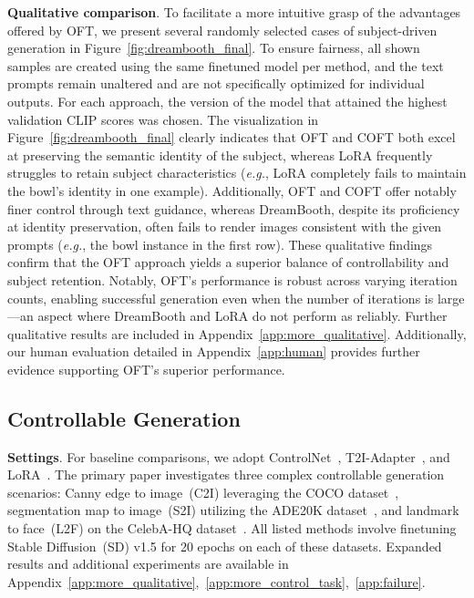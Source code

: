 {\textbf{Qualitative comparison}. To facilitate a more intuitive grasp of the advantages offered by OFT, we present several randomly selected cases of subject-driven generation in Figure~\ref{fig:dreambooth_final}. To ensure fairness, all shown samples are created using the same finetuned model per method, and the text prompts remain unaltered and are not specifically optimized for individual outputs. For each approach, the version of the model that attained the highest validation CLIP scores was chosen. The visualization in Figure~\ref{fig:dreambooth_final} clearly indicates that OFT and COFT both excel at preserving the semantic identity of the subject, whereas LoRA frequently struggles to retain subject characteristics (\emph{e.g.}, LoRA completely fails to maintain the bowl's identity in one example). Additionally, OFT and COFT offer notably finer control through text guidance, whereas DreamBooth, despite its proficiency at identity preservation, often fails to render images consistent with the given prompts (\emph{e.g.}, the bowl instance in the first row). These qualitative findings confirm that the OFT approach yields a superior balance of controllability and subject retention. Notably, OFT's performance is robust across varying iteration counts, enabling successful generation even when the number of iterations is large—an aspect where DreamBooth and LoRA do not perform as reliably. Further qualitative results are included in Appendix~\ref{app:more_qualitative}. Additionally, our human evaluation detailed in Appendix~\ref{app:human} provides further evidence supporting OFT's superior performance.

\subsection{Controllable Generation}

\textbf{Settings}. For baseline comparisons, we adopt ControlNet~\cite{zhang2023adding}, T2I-Adapter~\cite{mou2023t2i}, and LoRA~\cite{hulora2022}. The primary paper investigates three complex controllable generation scenarios: Canny edge to image~(C2I) leveraging the COCO dataset~\cite{lin2014microsoft}, segmentation map to image~(S2I) utilizing the ADE20K dataset~\cite{zhou2017scene}, and landmark to face~(L2F) on the CelebA-HQ dataset~\cite{karras2018progressive,xia2021tedigan}. All listed methods involve finetuning Stable Diffusion~(SD) v1.5 for 20 epochs on each of these datasets. Expanded results and additional experiments are available in Appendix~\ref{app:more_qualitative},~\ref{app:more_control_task},~\ref{app:failure}.

}
